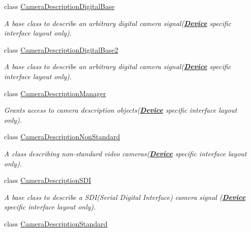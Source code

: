 \begin{DoxyCompactItemize}
class \hyperlink{classmv_i_m_p_a_c_t_1_1acquire_1_1_camera_description_digital_base}{Camera\+Description\+Digital\+Base}
\begin{DoxyCompactList}\small\item\em A base class to describe an arbitrary digital camera signal({\bfseries \hyperlink{classmv_i_m_p_a_c_t_1_1acquire_1_1_device}{Device}} specific interface layout only). \end{DoxyCompactList}\item 
class \hyperlink{classmv_i_m_p_a_c_t_1_1acquire_1_1_camera_description_digital_base2}{Camera\+Description\+Digital\+Base2}
\begin{DoxyCompactList}\small\item\em A base class to describe an arbitrary digital camera signal({\bfseries \hyperlink{classmv_i_m_p_a_c_t_1_1acquire_1_1_device}{Device}} specific interface layout only). \end{DoxyCompactList}\item 
class \hyperlink{classmv_i_m_p_a_c_t_1_1acquire_1_1_camera_description_manager}{Camera\+Description\+Manager}
\begin{DoxyCompactList}\small\item\em Grants access to camera description objects({\bfseries \hyperlink{classmv_i_m_p_a_c_t_1_1acquire_1_1_device}{Device}} specific interface layout only). \end{DoxyCompactList}\item 
class \hyperlink{classmv_i_m_p_a_c_t_1_1acquire_1_1_camera_description_non_standard}{Camera\+Description\+Non\+Standard}
\begin{DoxyCompactList}\small\item\em A class describing non-\/standard video cameras({\bfseries \hyperlink{classmv_i_m_p_a_c_t_1_1acquire_1_1_device}{Device}} specific interface layout only). \end{DoxyCompactList}\item 
class \hyperlink{classmv_i_m_p_a_c_t_1_1acquire_1_1_camera_description_s_d_i}{Camera\+Description\+S\+D\+I}
\begin{DoxyCompactList}\small\item\em A base class to describe a S\+D\+I(\+Serial Digital Interface) camera signal ({\bfseries \hyperlink{classmv_i_m_p_a_c_t_1_1acquire_1_1_device}{Device}} specific interface layout only). \end{DoxyCompactList}\item 
class \hyperlink{classmv_i_m_p_a_c_t_1_1acquire_1_1_camera_description_standard}{Camera\+Description\+Standard}

\end{DoxyCompactItemize}
